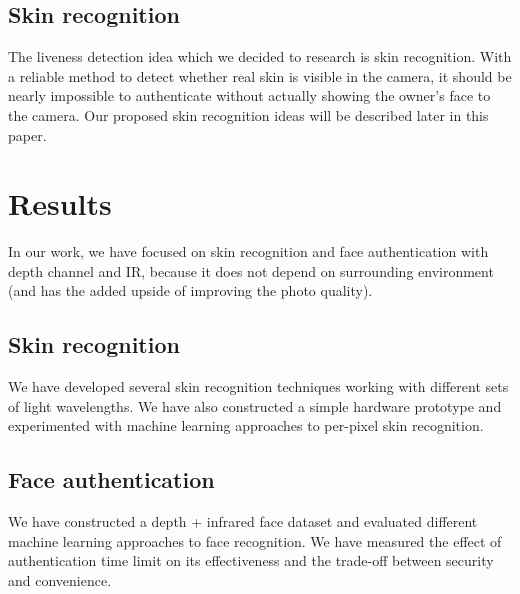         \subsection*{Skin recognition}
            The liveness detection idea which we decided to research is skin recognition.
            With a reliable method to detect whether real skin is visible in the camera,
            it should be nearly impossible to authenticate without actually showing
            the owner's face to the camera.
            Our proposed skin recognition ideas will be described later in this paper.

    \section{Results}
        In our work, we have focused on skin recognition and face authentication
        with depth channel and IR, because it does not depend on surrounding environment
        (and has the added upside of improving the photo quality\cite{niienphoto}).
        

        \subsection*{Skin recognition}
            We have developed several skin recognition techniques working with different
            sets of light wavelengths. We have also constructed a simple hardware prototype
            and experimented with machine learning approaches to per-pixel skin recognition.

        \subsection*{Face authentication}
            We have constructed a depth + infrared face dataset and evaluated different
            machine learning approaches to face recognition. We have measured the
            effect of authentication time limit on its effectiveness and the trade-off
            between security and convenience.
